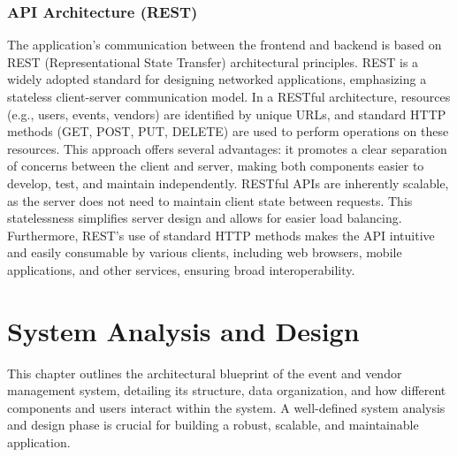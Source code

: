 \documentclass{report}
\begin{document}
\subsection{API Architecture (REST)}
The application's communication between the frontend and backend is based on REST (Representational State Transfer) architectural principles. REST is a widely adopted standard for designing networked applications, emphasizing a stateless client-server communication model. In a RESTful architecture, resources (e.g., users, events, vendors) are identified by unique URLs, and standard HTTP methods (GET, POST, PUT, DELETE) are used to perform operations on these resources. This approach offers several advantages: it promotes a clear separation of concerns between the client and server, making both components easier to develop, test, and maintain independently. RESTful APIs are inherently scalable, as the server does not need to maintain client state between requests. This statelessness simplifies server design and allows for easier load balancing. Furthermore, REST's use of standard HTTP methods makes the API intuitive and easily consumable by various clients, including web browsers, mobile applications, and other services, ensuring broad interoperability.

\chapter{System Analysis and Design}
\label{chap:system_analysis}
This chapter outlines the architectural blueprint of the event and vendor management system, detailing its structure, data organization, and how different components and users interact within the system. A well-defined system analysis and design phase is crucial for building a robust, scalable, and maintainable application.
\end{document}
